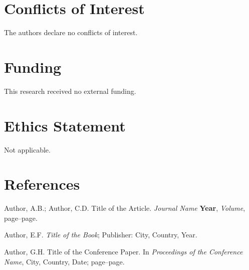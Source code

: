 \documentclass{rubbish}
\begin{document}
\begin{rubbishbody}
\section*{Conflicts of Interest}

The authors declare no conflicts of interest.

\section*{Funding}

This research received no external funding.

\section*{Ethics Statement}

Not applicable.

\section*{References}

\noindent [1] Author, A.B.; Author, C.D. Title of the Article.
\textit{Journal Name} \textbf{Year}, \textit{Volume}, page--page.

\medskip

\noindent [2] Author, E.F. \textit{Title of the Book}; Publisher:
City, Country, Year.

\medskip

\noindent [3] Author, G.H. Title of the Conference Paper. In
\textit{Proceedings of the Conference Name}, City, Country,
Date; page--page.

\end{rubbishbody}
\end{document}
